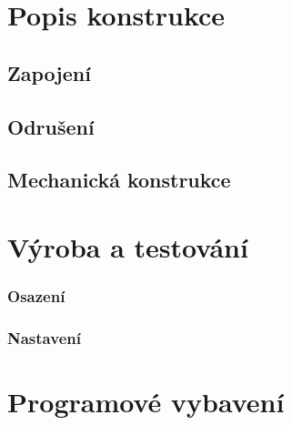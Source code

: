 \documentclass[12pt,a4paper,twoside]{article}
\begin{document}
\newpage
\section{Popis konstrukce}

\subsection{Zapojení}



\subsection{Odrušení}

\subsection{Mechanická konstrukce}

\section{Výroba a testování}

\subsubsection{Osazení}

\subsubsection{Nastavení}

\section{Programové vybavení}


\begin{thebibliography}{99}

\end{thebibliography}
\end{document}
